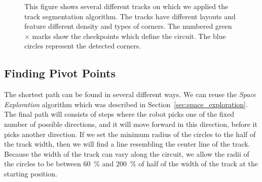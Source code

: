\begin{figure}
	\label{fig:corner_detection}
	\caption{This figure shows several different tracks on which we applied the track segmentation algorithm. The tracks have different layouts and feature different density and types of corners. The numbered green $\times$ marks show the checkpoints which define the circuit. The blue circles represent the detected corners.}
\end{figure}


\subsection{Finding Pivot Points}
The shortest path can be found in several different ways. We can reuse the \textit{Space Exploration} algorithm which was described in Section~\ref{sec:space_exploration}. The final path will consists of steps where the robot picks one of the fixed number of possible directions, and it will move forward in this direction, before it picks another direction. If we set the minimum radius of the circles to the half of the track width, then we will find a line resembling the center line of the track. Because the width of the track can vary along the circuit, we allow the radii of the circles to be between \SI{60}{\percent} and \SI{200}{\percent} of half of the width of the track at the starting position.

